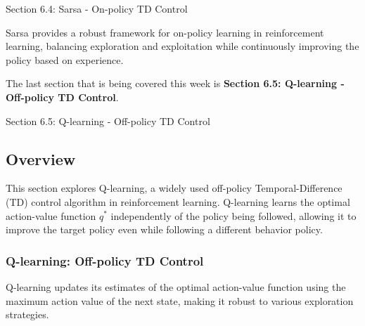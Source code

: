\begin{notes}{Section 6.4: Sarsa - On-policy TD Control}
\begin{highlight}
        Sarsa provides a robust framework for on-policy learning in reinforcement learning, balancing exploration and exploitation while continuously improving the policy based on experience.
    
    \end{highlight}
\end{notes}

The last section that is being covered this week is \textbf{Section 6.5: Q-learning - Off-policy TD Control}.

\begin{notes}{Section 6.5: Q-learning - Off-policy TD Control}
    \subsection*{Overview}

    This section explores Q-learning, a widely used off-policy Temporal-Difference (TD) control algorithm in reinforcement learning. Q-learning learns the optimal action-value function $q^*$ independently 
    of the policy being followed, allowing it to improve the target policy even while following a different behavior policy.
    
    \subsubsection*{Q-learning: Off-policy TD Control}
    
    Q-learning updates its estimates of the optimal action-value function using the maximum action value of the next state, making it robust to various exploration strategies.
    
    \begin{highlight}
    

\end{highlight}
\end{notes}
